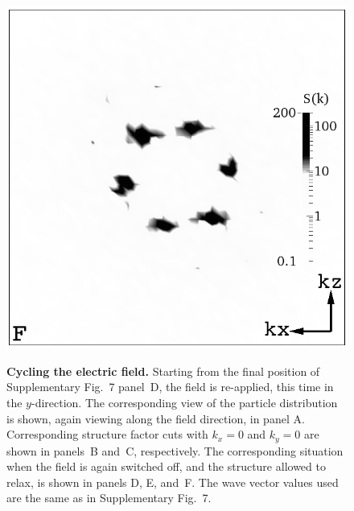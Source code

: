 \documentclass[12pt,twoside]{article}
\begin{document}
\begin{figure}[!h]
\begin{center}
\includegraphics[width=0.32\columnwidth]{sq_y_run1344.png}\\
\end{center}
\caption{\textbf{Cycling the electric field.}
Starting from the final position of
Supplementary Fig.~7 panel~D, the field is re-applied, this time in the
$y$-direction. The corresponding view of the particle distribution is
shown, again viewing along the field direction, in panel A.
Corresponding structure factor cuts with $k_x = 0$ and $k_y = 0$ are
shown in panels~B and~C, respectively. The corresponding situation when
the field is again switched off, and the structure allowed to relax,
is shown in panels D, E, and~F. The wave vector values used are the
same as in Supplementary Fig.~7.}
\end{figure}

\newpage
\end{document}
